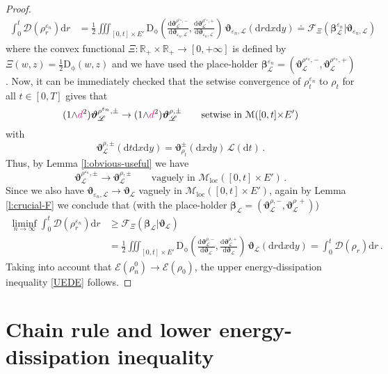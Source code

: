 \documentclass[11pt,reqno]{amsart}
\numberwithin{equation}{section}
\newcommand{\R}{\mathbb{R}}
\newcommand{\calF}{\mathcal{F}}
\newcommand{\calM}{\mathcal{M}}
\newcommand{\scrL}{\mathscr{L}}
\newcommand{\eps}{\varepsilon}
\newcommand{\dnabla}{\overline\nabla}
\newcommand{\dd}{\mathrm{d}}
\theoremstyle{definition}
\newcommand{\ep}{\varepsilon}
\let\eps\ep
\def\dd{\mathrm{d}}
\newcommand{\Fish}{\mathscr{D}}
\newcommand{\teta}{\boldsymbol \vartheta}
\def\calF{\mathscr F}
\newcommand{\Lebone}{\scrL}
\newcommand{\scrE}{\mathscr{E}}
\newcommand{\Ed}{{E'}}
\newcommand{\Mloc}{\mathcal{M}_{\mathrm{loc}}}
\newcommand{\ej}{\eps_n}
\newcommand{\bbeta}{\boldsymbol \beta}
\newcommand{\RNEW}{\color{black}} %
\newcommand{\TODOH}[1]{\todo[inline, color=yellow!20]{#1}}
\newcommand{\EEE}{\color{black}}
\newcommand{\dpi}{{\color{magenta} d}}
\numberwithin{equation}{section}
\begin{document}
\begin{proof}
\[
\begin{aligned}
\int_0^t \Fish(\rho_r^{\ej}) \dd r  & = 
\frac12 \iiint_{[0,t]{\times}E'}   \mathrm{D}_\upphi\left( \frac{\dd \teta_{\Lebone}^{\rho^{\ej},-}}{\dd \teta_{\ej,\Lebone}}, \frac{\dd \teta_{\Lebone}^{\rho^{\ej},+}}
{\dd \teta_{\ej,\Lebone}}\right)\, 
\teta_{\ej,\Lebone}(\dd r \dd x \dd y) \doteq   \calF_{\Xi} (\bbeta_\Lebone^{\ej}|\teta_{\ej,\Lebone}) 
\end{aligned}
\]
where the convex functional $\Xi: \R_+ \times \R_+ \to [0,+\infty]$ is defined by $\Xi(w,z) = \tfrac12 \mathrm{D}_\upphi(w,z)$ and we have used the place-holder
$\bbeta_\Lebone^{\ej} =(\teta_{\Lebone}^{\rho^{\ej},-},\teta_{\Lebone}^{\rho^{\ej},+})$. 
Now, it can be immediately checked that the setwise convergence of $\rho_t^{\eps_n}$ to $\rho_t$ for 
all $t\in [0,T]$
 gives that 
\[
(1{\wedge} \dpi^2) \teta_{\Lebone}^{\rho^{\ej},\pm} \to (1{\wedge} \dpi^2) \teta_{\Lebone}^{\rho,\pm}  \qquad \text{setwise in }  \calM([0,t]{\times}\Ed)
\]
with 
\[
\teta_{\Lebone}^{\rho,\pm} (\dd t \dd x \dd y)  = \teta_{\rho_t}^{\pm} (\dd x \dd y) \, \Lebone(\dd t)\,.
\]
Thus, \RNEW by Lemma \ref{l:obvious-useful} we have \EEE
\[
 \teta_{\Lebone}^{\rho^{\ej},\pm} \to  \teta_{\Lebone}^{\rho,\pm}  \qquad \text{vaguely in }  \Mloc([0,t]{\times}\Ed)\,.
\]
Since we also have $\teta_{\ej,\Lebone} \to \teta_{\Lebone}$ vaguely in $ \Mloc([0,t]{\times}\Ed)$, again by Lemma  \ref{l:crucial-F} we conclude that 
(with the place-holder $\bbeta_\Lebone =(\teta_{\Lebone}^{\rho,-},\teta_{\Lebone}^{\rho^,+})$) 
\[
\begin{aligned}
\liminf_{n\to\infty} \int_0^t \Fish(\rho_r^{\ej}) \dd r 
&  \geq    \calF_{\Xi} (\bbeta_\Lebone|\teta_{\Lebone}) 
 \\
 &
=  \frac12 \iiint_{[0,t]{\times}E'}   \mathrm{D}_\upphi\left( \frac{\dd \teta_{\Lebone}^{\rho,-}}{\dd \teta_{\Lebone}}, \frac{\dd \teta_{\Lebone}^{\rho,+}}
{\dd \teta_{\Lebone}}\right) \, \teta_{\Lebone}(\dd r \dd x \dd y)
=\int_0^t \Fish(\rho_r) \dd r \,.
\end{aligned}
\]
Taking into account that $\scrE(\rho_n^0)\to \scrE(\rho_0)$, the upper energy-dissipation inequality \eqref{UEDE} follows.
\end{proof}

\section{Chain rule and lower  energy-dissipation inequality}
\label{s:6}
\end{document}
